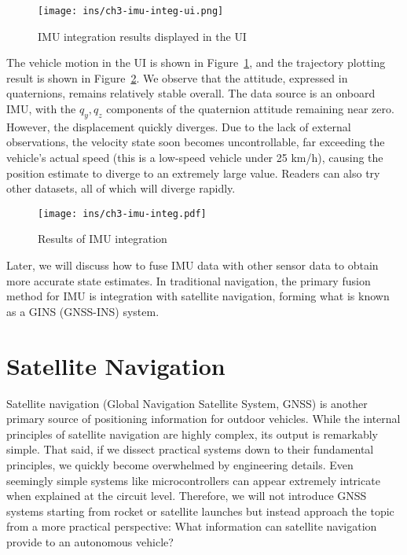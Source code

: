 \begin{figure}
	\centering
	\texttt{[image: ins/ch3-imu-integ-ui.png]}
	\caption{IMU integration results displayed in the UI}
	\label{fig:ch3-imu-integ-ui}
\end{figure}

The vehicle motion in the UI is shown in Figure~\ref{fig:ch3-imu-integ-ui}, and the trajectory plotting result is shown in Figure~\ref{fig:ch3-imu-integ}. We observe that the attitude, expressed in quaternions, remains relatively stable overall. The data source is an onboard IMU, with the $q_y, q_z$ components of the quaternion attitude remaining near zero. However, the displacement quickly diverges. Due to the lack of external observations, the velocity state soon becomes uncontrollable, far exceeding the vehicle's actual speed (this is a low-speed vehicle under 25 km/h), causing the position estimate to diverge to an extremely large value. Readers can also try other datasets, all of which will diverge rapidly.

\begin{figure}
	\centering
	\texttt{[image: ins/ch3-imu-integ.pdf]}
	\caption{Results of IMU integration}
	\label{fig:ch3-imu-integ}
\end{figure}

Later, we will discuss how to fuse IMU data with other sensor data to obtain more accurate state estimates. In traditional navigation, the primary fusion method for IMU is integration with satellite navigation, forming what is known as a GINS (GNSS-INS) system.

\section{Satellite Navigation}
Satellite navigation (Global Navigation Satellite System, GNSS) is another primary source of positioning information for outdoor vehicles. While the internal principles of satellite navigation are highly complex, its output is remarkably simple. That said, if we dissect practical systems down to their fundamental principles, we quickly become overwhelmed by engineering details. Even seemingly simple systems like microcontrollers can appear extremely intricate when explained at the circuit level. Therefore, we will not introduce GNSS systems starting from rocket or satellite launches but instead approach the topic from a more practical perspective: What information can satellite navigation provide to an autonomous vehicle?

